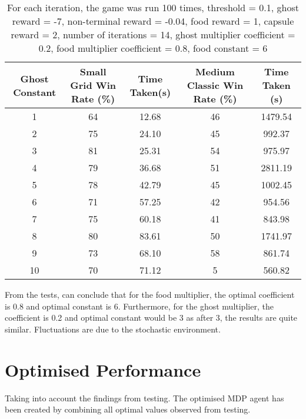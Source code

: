 \documentclass[12pt]{report}
\begin{document}
              \vspace{-9mm}
              \begin{table}[H]
                \begin{center}
                  \begin{adjustbox}{max width=\textwidth}
                    \begin{tabular}{*{5}{c}}
                      \textbf{Ghost Constant} & \textbf{Small Grid Win Rate (\%)} & \textbf{Time Taken(s)} & \textbf{Medium Classic Win Rate (\%)} & \textbf{Time Taken (s)}\\
                    \hline
                          1 & 64 & 12.68 & 46 & 1479.54 \\
                          2 & 75 & 24.10 & 45 & 992.37 \\
                          3 & 81 & 25.31 & 54 & 975.97 \\
                          4 & 79 & 36.68 & 51 & 2811.19 \\
                          5 & 78 & 42.79 & 45 & 1002.45 \\
                          6 & 71 & 57.25 & 42 & 954.56\\
                          7 & 75 & 60.18 & 41 & 843.98\\
                          8 & 80 & 83.61 & 50 & 1741.97 \\
                          9 & 73 & 68.10 & 58 & 861.74 \\
                          10 & 70 & 71.12 & 5 & 560.82 \\

                  \end{tabular}
                  \end{adjustbox}
                  \caption{For each iteration, the game was run 100 times, threshold = 0.1, ghost reward = -7, non-terminal reward = -0.04, food reward = 1, capsule reward = 2, number of iterations = 14, ghost multiplier coefficient = 0.2, food multiplier coefficient = 0.8, food constant = 6}
                  \label{tab:table4}
                \end{center}
              \end{table}
              From the tests, can conclude that for the food multiplier, the optimal coefficient is 0.8 and optimal constant is 6. Furthermore, for the ghost multiplier, the coefficient is 0.2 and optimal constant would be 3 as after 3, the results are quite similar. Fluctuations are due to the stochastic environment.
  \section*{Optimised Performance}
  Taking into account the findings from testing. The optimised MDP agent has been created by combining all optimal values observed from testing.
\end{document}
